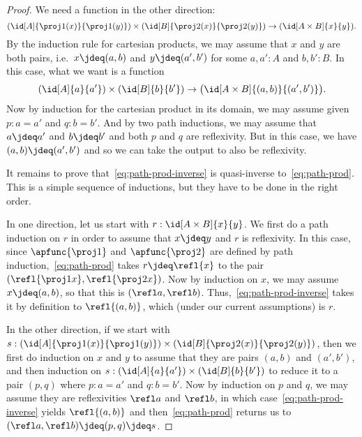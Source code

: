 \begin{proof}
  We need a function in the other direction:
  \begin{equation}
    (\id[A]{\proj1(x)}{\proj1(y)}) \times (\id[B]{\proj2(x)}{\proj2(y)}) \to (\id[A\times B]{x}{y}). \label{eq:path-prod-inverse}
  \end{equation}
  By the induction rule for cartesian products, we may assume that $x$ and $y$ are both pairs, i.e.\ $x\jdeq (a,b)$ and $y\jdeq (a',b')$ for some $a,a':A$ and $b,b':B$.
  In this case, what we want is a function
  \begin{equation*}
    (\id[A]{a}{a'}) \times (\id[B]{b}{b'}) \to \big(\id[A\times B]{(a,b)}{(a',b')}\big).
  \end{equation*}
  Now by induction for the cartesian product in its domain, we may assume given $p:a=a'$ and $q:b=b'$.
  And by two path inductions, we may assume that $a\jdeq a'$ and $b\jdeq b'$ and both $p$ and $q$ are reflexivity.
  But in this case, we have $(a,b)\jdeq(a',b')$ and so we can take the output to also be reflexivity.

  It remains to prove that~\eqref{eq:path-prod-inverse} is quasi-inverse to~\eqref{eq:path-prod}.
  This is a simple sequence of inductions, but they have to be done in the right order.

  In one direction, let us start with $r:\id[A\times B]{x}{y}$.
  We first do a path induction on $r$ in order to assume that $x\jdeq y$ and $r$ is reflexivity.
  In this case, since $\apfunc{\proj1}$ and $\apfunc{\proj2}$ are defined by path induction,~\eqref{eq:path-prod} takes $r\jdeq \refl{x}$ to the pair $(\refl{\proj1x},\refl{\proj2x})$.
  Now by induction on $x$, we may assume $x\jdeq (a,b)$, so that this is $(\refl a, \refl b)$.
  Thus,~\eqref{eq:path-prod-inverse} takes it by definition to $\refl{(a,b)}$, which (under our current assumptions) is $r$.

  In the other direction, if we start with $s:(\id[A]{\proj1(x)}{\proj1(y)}) \times (\id[B]{\proj2(x)}{\proj2(y)})$, then we first do induction on $x$ and $y$ to assume that they are pairs $(a,b)$ and $(a',b')$, and then induction on $s:(\id[A]{a}{a'}) \times (\id[B]{b}{b'})$ to reduce it to a pair $(p,q)$ where $p:a=a'$ and $q:b=b'$.
  Now by induction on $p$ and $q$, we may assume they are reflexivities $\refl a$ and $\refl b$, in which case~\eqref{eq:path-prod-inverse} yields $\refl{(a,b)}$ and then~\eqref{eq:path-prod} returns us to $(\refl a,\refl b)\jdeq (p,q)\jdeq s$.
\end{proof}

